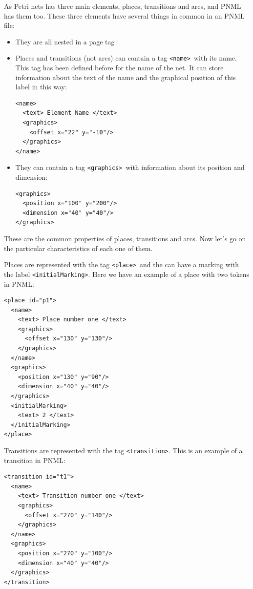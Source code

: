 \begin{enumerate}
As Petri nets has three main elements, places, transitions
and arcs, and PNML has them too. These three elements have several things in common in an PNML file:
\begin{itemize}
  \item They are all nested in a page tag


  \item Places and transitions (not arcs) can contain a tag \texttt{\textless name\textgreater}\ with its name. This tag has been defined before for the name of the net. It
can store information about the text of the name and the graphical position
of this label in this way:
\begin{lstlisting}
<name>
  <text> Element Name </text>
  <graphics>
    <offset x="22" y="-10"/>
  </graphics>
</name>
\end{lstlisting}
   \item They can contain a tag \texttt{\textless graphics\textgreater}\ with information about its position and dimension:
\begin{lstlisting}
<graphics>
  <position x="100" y="200"/>
  <dimension x="40" y="40"/>
</graphics>
\end{lstlisting}
\end{itemize}


These are the common properties of places, transitions and arcs. Now let's
go on the particular characteristics of each one of them.

Places are represented with the tag \texttt{\textless place\textgreater}\ and the can have a marking with the label \texttt{\textless initialMarking\textgreater}.
Here we have an example of a place with two tokens in PNML: 

\begin{lstlisting}[label=pmnl_place,caption=PNML representation
for places]
<place id="p1">
  <name>
    <text> Place number one </text>
    <graphics>
      <offset x="130" y="130"/>
    </graphics>
  </name>
  <graphics>
    <position x="130" y="90"/>
    <dimension x="40" y="40"/>
  </graphics>
  <initialMarking>
    <text> 2 </text>
  </initialMarking>
</place>
\end{lstlisting}

Transitions are represented with the tag \texttt{\textless transition\textgreater}.
This is an example of a transition in PNML: 

\begin{lstlisting}[label=pmnl_transition,caption=PNML representation
for transitions]
<transition id="t1">
  <name>
    <text> Transition number one </text>
    <graphics>
      <offset x="270" y="140"/>
    </graphics>
  </name>
  <graphics>
    <position x="270" y="100"/>
    <dimension x="40" y="40"/>
  </graphics>
</transition>
\end{lstlisting}


\end{enumerate}
